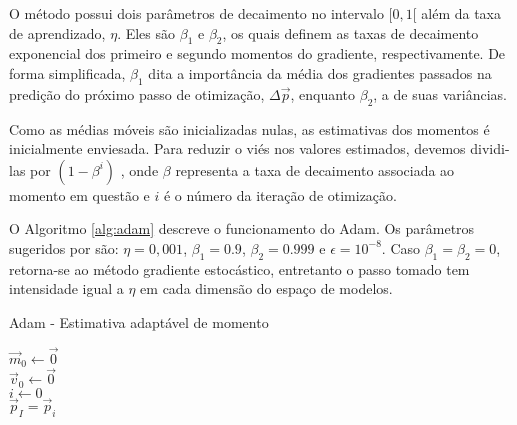       O método possui dois parâmetros de decaimento no intervalo $[0,1[$ além da taxa de aprendizado, $\eta$. Eles são $\beta_1$ e $\beta_2$, os quais definem as taxas de decaimento exponencial dos primeiro e segundo momentos do gradiente, respectivamente. De forma simplificada, $\beta_1$ dita a importância da média dos gradientes passados na predição do próximo passo de otimização, $\Delta \vec{p}$, enquanto $\beta_2$, a de suas variâncias.

      Como as médias móveis são inicializadas nulas, as estimativas dos momentos é inicialmente enviesada. Para reduzir o viés nos valores estimados, devemos dividi-las por $(1-\beta^i)$ , onde $\beta$ representa a taxa de decaimento associada ao momento em questão e $i$ é o número da iteração de otimização.

      O Algoritmo \ref{alg:adam} descreve o funcionamento do Adam. Os parâmetros sugeridos por  são: $\eta= 0,001$, $\beta_1= 0.9$, $\beta_2= 0.999$ e $\epsilon= 10^{-8}$. Caso $\beta_1 = \beta_2 = 0$, retorna-se ao método gradiente estocástico, entretanto o passo tomado tem intensidade igual a $\eta$ em cada dimensão do espaço de modelos.

      \begin{algorithm}
        \caption{Adam - Estimativa adaptável de momento}\label{alg:adam}
        \Entrada{$\beta_1 \in [0,1[$: taxa de decaimento exponencial do primeiro momento}
        \Entrada{$\beta_2 \in [0,1[$: taxa de decaimento exponencial do segundo momento}
        \BlankLine
        $\vec{m}_0 \gets \vec{0}$ \\
        $\vec{v}_0 \gets \vec{0}$ \\
        $i \gets 0$ \\

        $\vec{p}_I = \vec{p}_i$
      \end{algorithm}

